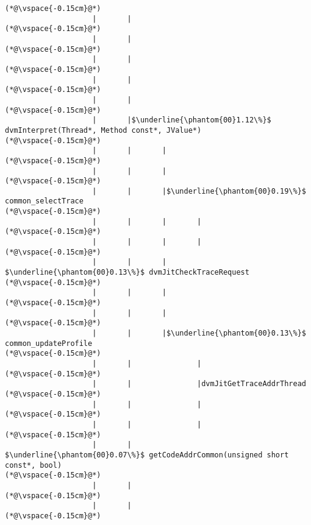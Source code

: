 \begin{lstlisting}[caption=Metodikutsu C$\to$Java 20 viiteparametrilla, label=profile:C2JBenchmark00206, numberbychapter=true, frame=lines, float, floatplacement=t]
(*@\vspace{-0.15cm}@*)
                    |       |
(*@\vspace{-0.15cm}@*)
                    |       |
(*@\vspace{-0.15cm}@*)
                    |       |
(*@\vspace{-0.15cm}@*)
                    |       |
(*@\vspace{-0.15cm}@*)
                    |       |
(*@\vspace{-0.15cm}@*)
                    |       |$\underline{\phantom{00}1.12\%}$ dvmInterpret(Thread*, Method const*, JValue*)
(*@\vspace{-0.15cm}@*)
                    |       |       |
(*@\vspace{-0.15cm}@*)
                    |       |       |
(*@\vspace{-0.15cm}@*)
                    |       |       |$\underline{\phantom{00}0.19\%}$ common_selectTrace
(*@\vspace{-0.15cm}@*)
                    |       |       |       |
(*@\vspace{-0.15cm}@*)
                    |       |       |       |
(*@\vspace{-0.15cm}@*)
                    |       |       |        $\underline{\phantom{00}0.13\%}$ dvmJitCheckTraceRequest
(*@\vspace{-0.15cm}@*)
                    |       |       |
(*@\vspace{-0.15cm}@*)
                    |       |       |
(*@\vspace{-0.15cm}@*)
                    |       |       |$\underline{\phantom{00}0.13\%}$    common_updateProfile
(*@\vspace{-0.15cm}@*)
                    |       |               |
(*@\vspace{-0.15cm}@*)
                    |       |               |dvmJitGetTraceAddrThread
(*@\vspace{-0.15cm}@*)
                    |       |               |
(*@\vspace{-0.15cm}@*)
                    |       |               |
(*@\vspace{-0.15cm}@*)
                    |       |                $\underline{\phantom{00}0.07\%}$ getCodeAddrCommon(unsigned short const*, bool)
(*@\vspace{-0.15cm}@*)
                    |       |        
(*@\vspace{-0.15cm}@*)
                    |       |        
(*@\vspace{-0.15cm}@*)

\end{lstlisting}
